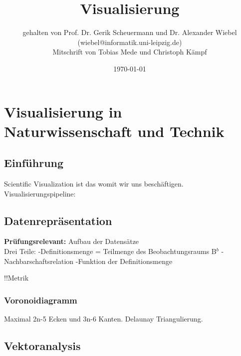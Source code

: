 \documentclass[12pt,a4paper,oneside,normalheadings,abstracton,liststotoc,bibtotoc,titlepage,pdftex]{scrartcl}
\begin{document}

\titlehead{Universität Leipzig\\Fakultät für Fakultät für Mathematik und Informatik}
\subject{Vorlesungsmitschrift SoSe 11}
\title{Visualisierung}
\author{gehalten von Prof. Dr. Gerik Scheuermann und Dr. Alexander Wiebel (wiebel@informatik.uni-leipzig.de)\\
Mitschrift von Tobias Mede und Christoph Kämpf}
\date{\today}

\maketitle[1]

\begin{abstract}

\end{abstract}

\tableofcontents
\pagebreak


\chapter{Visualisierung in Naturwissenschaft und Technik}

\section{Einführung}
Scientific Visualization ist das womit wir uns beschäftigen.
Visualisierungspipeline:


\section{Datenrepräsentation}
\textbf{Prüfungsrelevant:} Aufbau der Datensätze\\


Drei Teile:
-Definitionsmenge = Teilmenge des Beobachtungsraums B$^b$
-Nachbarschaftsrelation
-Funktion der Definitionsmenge

!!Metrik
\subsection{Voronoidiagramm}
Maximal 2n-5 Ecken und 3n-6 Kanten. Delaunay Triangulierung.

\section{Vektoranalysis}
\end{document}
